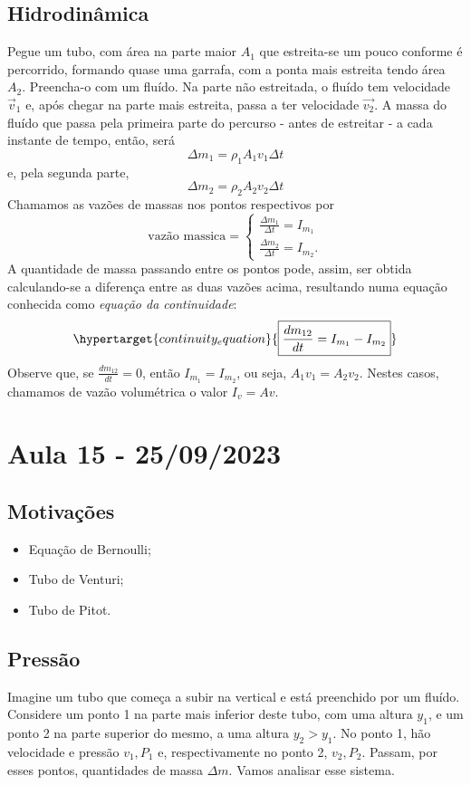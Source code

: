 \documentclass{article}
\begin{document}
\subsection{Hidrodinâmica}
  Pegue um tubo, com área na parte maior \(A_{1}\) que estreita-se um pouco conforme é percorrido, formando quase uma garrafa, com a ponta mais estreita tendo área \(A_{2}\).
Preencha-o com um fluído. Na parte não estreitada, o fluído tem velocidade \(\vec{v}_{1}\) e, após chegar na parte mais estreita, passa a ter velocidade \(\vec{v_{2}}\).
A massa do fluído que passa pela primeira parte do percurso - antes de estreitar - a cada instante de tempo, então, será 
  \[
    \Delta m_{1} = \rho_{1}A_{1}v_{1}\Delta t
  \]
  e, pela segunda parte, 
  \[
    \Delta m_{2} = \rho_{2}A_{2}v_{2}\Delta t
  \]
  Chamamos as vazões de massas nos pontos respectivos por 
    \[
      \text{vazão massica} = \left\{\begin{array}{ll}
          \frac{\Delta m_{1}}{\Delta t} = I_{m_{1}}\\
          \frac{\Delta m_{2}}{\Delta t} = I_{m_{2}}.
        \end{array}\right.
    \]
  A quantidade de massa passando entre os pontos pode, assim, ser obtida calculando-se a diferença entre as duas vazões acima,
resultando numa equação conhecida como \textit{equação da continuidade}:
    \[
      \hypertarget{continuity_equation}{\boxed{\frac{dm_{12}}{dt} = I_{m_{1}}-I_{m_{2}}}}
    \]
  Observe que, se \(\frac{dm_{12}}{dt} = 0\), então \(I_{m_{1}} = I_{m_{2}}\), ou seja, \(A_{1}v_{1}=A_{2}v_{2}\). Nestes casos, chamamos de vazão
volumétrica o valor \(I_{v}=Av\).
\newpage

\section{Aula 15 - 25/09/2023}
\subsection{Motivações}
 \begin{itemize}
   \item Equação de Bernoulli;
   \item Tubo de Venturi;
   \item Tubo de Pitot.
 \end{itemize}
\subsection{Pressão}
  Imagine um tubo que começa a subir na vertical e está preenchido por um fluído. Considere um ponto 1 na parte mais inferior deste tubo, com uma altura \(y_{1}\),
e um ponto 2 na parte superior do mesmo, a uma altura \(y_{2} > y_{1}\). No ponto 1, hão velocidade e pressão \(v_{1}, P_{1}\) e, respectivamente no ponto 2, \(v_{2}, P_{2}\).
Passam, por esses pontos, quantidades de massa \(\Delta m\). Vamos analisar esse sistema.
\end{document}
